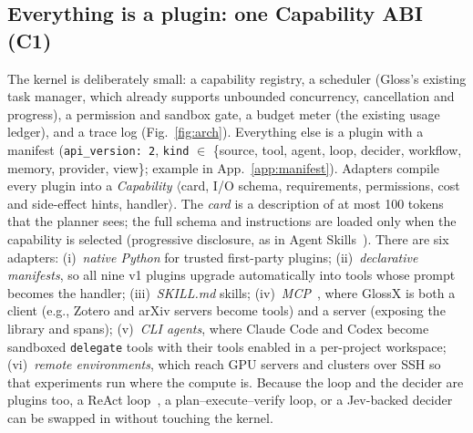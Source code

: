 \documentclass{article}
\newcommand{\sysname}{GlossX}
\newcommand{\gloss}{Gloss}
\begin{document}
\subsection{Everything is a plugin: one Capability ABI (C1)}
The kernel is deliberately small: a capability registry, a scheduler (\gloss{}'s existing task manager, which already supports unbounded concurrency, cancellation and progress), a permission and sandbox gate, a budget meter (the existing usage ledger), and a trace log (Fig.~\ref{fig:arch}). Everything else is a plugin with a manifest (\texttt{api\_version: 2}, \texttt{kind} $\in$ \{source, tool, agent, loop, decider, workflow, memory, provider, view\}; example in App.~\ref{app:manifest}). Adapters compile every plugin into a \emph{Capability} $\langle$card, I/O schema, requirements, permissions, cost and side-effect hints, handler$\rangle$. The \emph{card} is a description of at most 100 tokens that the planner sees; the full schema and instructions are loaded only when the capability is selected (progressive disclosure, as in Agent Skills~\cite{agentskills2025}). There are six adapters:
(i)~\emph{native Python} for trusted first-party plugins;
(ii)~\emph{declarative manifests}, so all nine v1 plugins upgrade automatically into tools whose prompt becomes the handler;
(iii)~\emph{SKILL.md} skills;
(iv)~\emph{MCP}~\cite{mcp2024}, where \sysname{} is both a client (e.g., Zotero and arXiv servers become tools) and a server (exposing the library and spans);
(v)~\emph{CLI agents}, where Claude Code and Codex become sandboxed \texttt{delegate} tools with their tools enabled in a per-project workspace; (vi)~\emph{remote environments}, which reach GPU servers and clusters over SSH so that experiments run where the compute is.
Because the loop and the decider are plugins too, a ReAct loop~\cite{yao2023react}, a plan--execute--verify loop, or a Jev-backed decider~\cite{jev2026} can be swapped in without touching the kernel.
\end{document}
